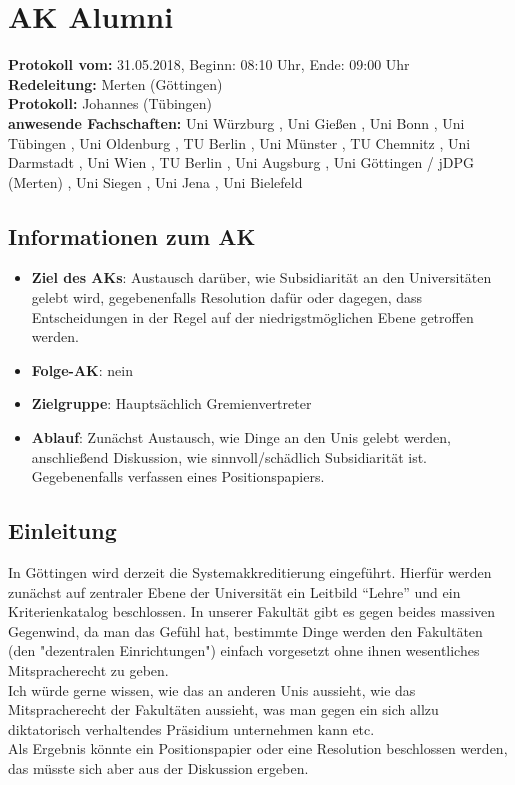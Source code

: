
\section{AK Alumni}

  \textbf{Protokoll vom:} 31.05.2018,
  Beginn: 08:10 Uhr,
  Ende: 09:00 Uhr \\
  \textbf{Redeleitung:} Merten (Göttingen) \\
  \textbf{Protokoll:} Johannes (Tübingen) \\
  \textbf{anwesende Fachschaften:} Uni Würzburg , Uni Gießen , Uni Bonn , Uni Tübingen , Uni Oldenburg , TU Berlin , Uni Münster , TU Chemnitz , Uni Darmstadt , Uni Wien , TU Berlin , Uni Augsburg , Uni Göttingen / jDPG (Merten) , Uni Siegen , Uni Jena , Uni Bielefeld



  \subsection*{Informationen zum AK}
    \begin{itemize}
      \item \textbf{Ziel des AKs}: Austausch darüber, wie Subsidiarität an den Universitäten gelebt wird, gegebenenfalls Resolution dafür oder dagegen, dass Entscheidungen in der Regel auf der niedrigstmöglichen Ebene getroffen werden.
      \item \textbf{Folge-AK}: nein
      \item \textbf{Zielgruppe}: Hauptsächlich Gremienvertreter
      \item \textbf{Ablauf}: Zunächst Austausch, wie Dinge an den Unis gelebt werden, anschließend Diskussion, wie sinnvoll/schädlich Subsidiarität ist. Gegebenenfalls verfassen eines Positionspapiers.
    \end{itemize}

  \subsection*{Einleitung}
    In Göttingen wird derzeit die Systemakkreditierung eingeführt. Hierfür werden zunächst auf zentraler Ebene der Universität ein Leitbild ``Lehre'' und ein Kriterienkatalog beschlossen. In unserer Fakultät gibt es gegen beides massiven Gegenwind, da man das Gefühl hat, bestimmte Dinge werden den Fakultäten (den "dezentralen Einrichtungen") einfach vorgesetzt ohne ihnen wesentliches Mitspracherecht zu geben. \\
    Ich würde gerne wissen, wie das an anderen Unis aussieht, wie das Mitspracherecht der Fakultäten aussieht, was man gegen ein sich allzu diktatorisch verhaltendes Präsidium unternehmen kann etc. \\
    Als Ergebnis könnte ein Positionspapier oder eine Resolution beschlossen werden, das müsste sich aber aus der Diskussion ergeben.


